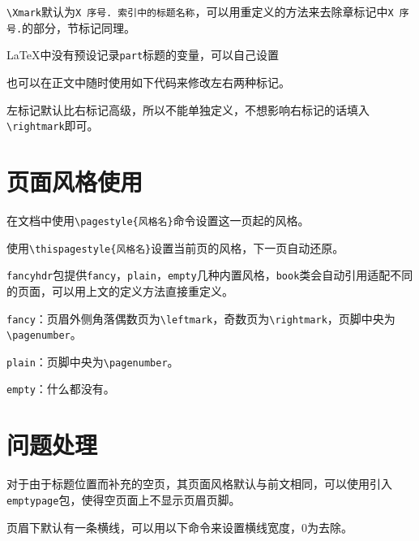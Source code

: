 \documentclass[10pt,openany]{book}
\begin{document}
\begin{sloppypar}
    

    \texttt{\textbackslash{}Xmark}默认为\texttt{X\ 序号.\ 索引中的标题名称}，可以用重定义的方法来去除章标记中\texttt{X\ 序号.}的部分，节标记同理。

    

    {\LaTeX}中没有预设记录\texttt{part}标题的变量，可以自己设置

    

    也可以在正文中随时使用如下代码来修改左右两种标记。

    

    左标记默认比右标记高级，所以不能单独定义，不想影响右标记的话填入\texttt{\textbackslash{}rightmark}即可。

    \section{页面风格使用}

    在文档中使用\texttt{\textbackslash{}pagestyle\{风格名\}}命令设置这一页起的风格。

    使用\texttt{\textbackslash{}thispagestyle\{风格名\}}设置当前页的风格，下一页自动还原。

    \texttt{fancyhdr}包提供\texttt{fancy}，\texttt{plain}，\texttt{empty}几种内置风格，\texttt{book}类会自动引用适配不同的页面，可以用上文的定义方法直接重定义。

    \texttt{fancy}：页眉外侧角落偶数页为\texttt{\textbackslash{}leftmark}，奇数页为\texttt{\textbackslash{}rightmark}，页脚中央为\texttt{\textbackslash{}pagenumber}。

    \texttt{plain}：页脚中央为\texttt{\textbackslash{}pagenumber}。

    \texttt{empty}：什么都没有。

    \section{问题处理}

    对于由于标题位置而补充的空页，其页面风格默认与前文相同，可以使用引入\texttt{emptypage}包，使得空页面上不显示页眉页脚。

    页眉下默认有一条横线，可以用以下命令来设置横线宽度，0为去除。

    


\end{sloppypar}
\end{document}
